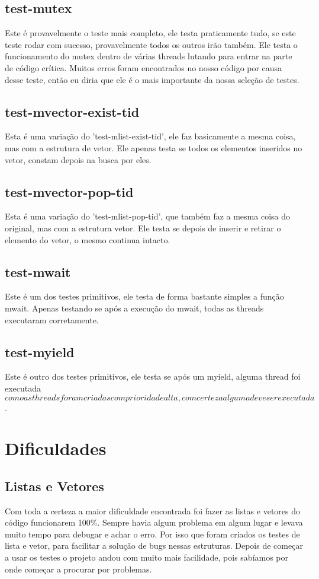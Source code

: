 \documentclass[12pt,a4paper]{report}
\begin{document}
\section{test-mutex}
	Este é provavelmente o teste mais completo, ele testa praticamente tudo, se este teste rodar com sucesso, provavelmente todos os outros irão também. Ele testa o funcionamento do mutex dentro de várias threads  lutando para entrar na parte de código crítica. Muitos erros foram encontrados no nosso código por causa desse teste, então eu diria que ele é o mais importante da nossa seleção de testes.
	
\section{test-mvector-exist-tid}
	Esta é uma variação do 'test-mlist-exist-tid', ele faz basicamente a mesma coisa, mas com a estrutura de vetor. Ele apenas testa se todos os elementos inseridos no vetor, constam depois na busca por eles.
	
\section{test-mvector-pop-tid}
	Esta é uma variação do 'test-mlist-pop-tid', que também faz a mesma coisa do original, mas com a estrutura vetor. Ele testa se depois de inserir e retirar o elemento do vetor, o mesmo continua intacto.
	
\section{test-mwait}
	Este é um dos testes primitivos, ele testa de forma bastante simples a função mwait. Apenas testando se após a execução do mwait, todas as threads executaram corretamente.
	
\section{test-myield}
	Este é outro dos testes primitivos, ele testa se após um myield, alguma thread foi executada \(como as threads foram criadas com prioridade alta, com certeza alguma deve ser executada\).
	
\chapter{Dificuldades}
\section{Listas e Vetores}
	Com toda a certeza a maior dificuldade encontrada foi fazer as listas e vetores do código funcionarem 100\%. Sempre havia algum problema em algum lugar e levava muito tempo para debugar e achar o erro. Por isso que foram criados os testes de lista e vetor, para facilitar a solução de bugs nessas estruturas. Depois de começar a usar os testes o projeto andou com muito mais facilidade, pois sabíamos por onde começar a procurar por problemas.
	
\end{document}
